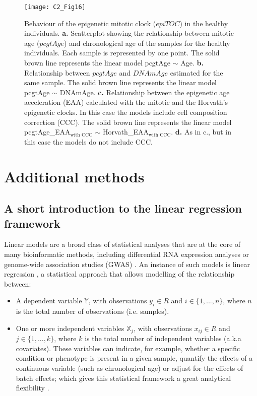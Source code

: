\begin{figure}[htbp!] 
	\centering
	\texttt{[image: C2\_Fig16]}
	\vspace*{2mm}    
	\caption[Behaviour of the epigenetic mitotic clock ($epiTOC$) in the healthy individuals]{Behaviour of the epigenetic mitotic clock ($epiTOC$) in the healthy individuals. \textbf{a.} Scatterplot showing the relationship between mitotic age ($pcgtAge$) \citep{Yang2016} and chronological age of the samples for the healthy individuals. Each sample is represented by one point. The solid brown line represents the linear model pcgtAge $\sim$ Age. \textbf{b.} Relationship between $pcgtAge$ and $DNAmAge$ estimated for the same sample. The solid brown line represents the linear model pcgtAge $\sim$ DNAmAge. \textbf{c.} Relationship between the epigenetic age acceleration (EAA) calculated with the mitotic and the Horvath's epigenetic clocks. In this case the models include cell composition correction (CCC). The solid brown line represents the linear model pcgtAge\_EAA$_{\text{with CCC}}$ $\sim$ Horvath\_EAA$_{\text{with CCC}}$. \textbf{d.} As in c., but in this case the models do not include CCC.}
	\label{fig:c2_fig16}
\end{figure}


\section{Additional methods} \label{s:2.4}

\subsection*{A short introduction to the linear regression framework}

Linear models are a broad class of statistical analyses that are at the core of many bioinformatic methods, including differential RNA expression analyses \citep{Ritchie2015} or genome-wide association studies (GWAS) \citep{Visscher2017}. An instance of such models is linear regression \citep{Eaton2007}, a statistical approach that allows modelling of the relationship between:

\begin{itemize}
	
	\item A dependent variable $\mathbb Y$, with observations $y_i \in R$ and $i \in \{1, ..., n\}$, where $n$ is the total number of observations (i.e. samples). 
	
	\item One or more independent variables $\mathbb X_j$, with observations $x_{ij} \in R$ and $j \in \{1, ..., k\}$, where $k$ is the total number of independent variables (a.k.a covariates). These variables can indicate, for example, whether a specific condition or phenotype is present in a given sample, quantify the effects of a continuous variable (such as chronological age) or adjust for the effects of batch effects; which gives this statistical framework a great analytical flexibility \citep{Ritchie2015}.
	
\end{itemize}

